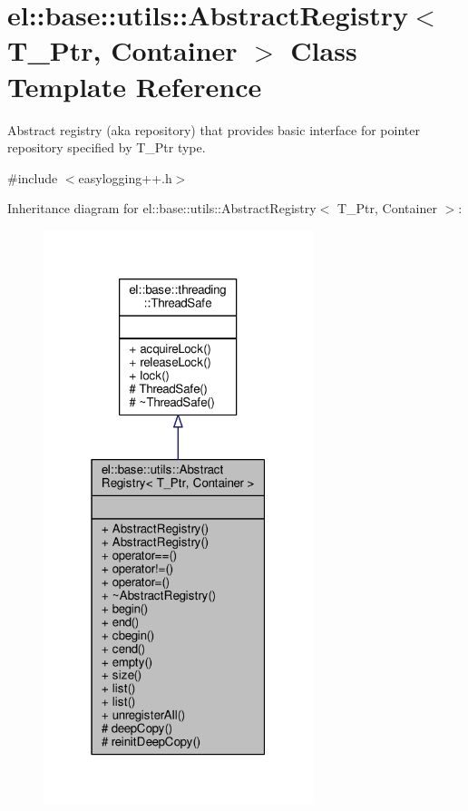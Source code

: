 \hypertarget{classel_1_1base_1_1utils_1_1AbstractRegistry}{}\section{el\+:\+:base\+:\+:utils\+:\+:Abstract\+Registry$<$ T\+\_\+\+Ptr, Container $>$ Class Template Reference}
\label{classel_1_1base_1_1utils_1_1AbstractRegistry}


Abstract registry (aka repository) that provides basic interface for pointer repository specified by T\+\_\+\+Ptr type.  




{\ttfamily \#include $<$easylogging++.\+h$>$}



Inheritance diagram for el\+:\+:base\+:\+:utils\+:\+:Abstract\+Registry$<$ T\+\_\+\+Ptr, Container $>$\+:
\nopagebreak
\begin{figure}[H]
\begin{center}
\leavevmode
\includegraphics[width=223pt]{d7/d28/classel_1_1base_1_1utils_1_1AbstractRegistry__inherit__graph}
\end{center}
\end{figure}


